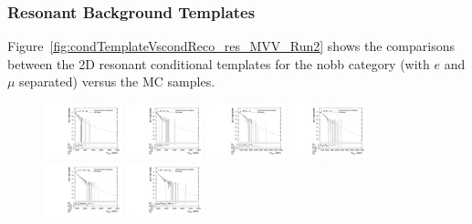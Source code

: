 \subsubsection{Resonant Background Templates}

Figure~\ref{fig:condTemplateVscondReco_res_MVV_Run2} shows the comparisons between the 2D resonant conditional templates for the nobb category (with $e$ and $\mu$ separated) versus the MC samples.

\begin{figure}[htbp]
  \centering
  \includegraphics[width=0.2\textwidth]{fig/analysisAppendix/templateVsReco_res_r0_MVV_mu_HP_bb_LDy.pdf}
  \includegraphics[width=0.2\textwidth]{fig/analysisAppendix/templateVsReco_res_r0_MVV_e_HP_bb_LDy.pdf}
  \includegraphics[width=0.2\textwidth]{fig/analysisAppendix/templateVsReco_res_r0_MVV_mu_LP_bb_LDy.pdf}
  \includegraphics[width=0.2\textwidth]{fig/analysisAppendix/templateVsReco_res_r0_MVV_e_LP_bb_LDy.pdf}\\
  \includegraphics[width=0.2\textwidth]{fig/analysisAppendix/templateVsReco_res_r0_MVV_mu_HP_nobb_LDy.pdf}
  \includegraphics[width=0.2\textwidth]{fig/analysisAppendix/templateVsReco_res_r0_MVV_e_HP_nobb_LDy.pdf}

\end{figure}
